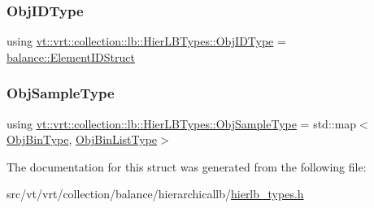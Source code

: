 \subsubsection{\texorpdfstring{Obj\+I\+D\+Type}{ObjIDType}}
{\footnotesize\ttfamily using \hyperlink{structvt_1_1vrt_1_1collection_1_1lb_1_1_hier_l_b_types_a9f71a6bbdc8603a2c58172521f82c5e2}{vt\+::vrt\+::collection\+::lb\+::\+Hier\+L\+B\+Types\+::\+Obj\+I\+D\+Type} =  \hyperlink{namespacevt_1_1vrt_1_1collection_1_1balance_a9f5b53fafb270212279a4757d2c4cd28}{balance\+::\+Element\+I\+D\+Struct}}

\mbox{\label{structvt_1_1vrt_1_1collection_1_1lb_1_1_hier_l_b_types_a597a60d517207b90e8c7984eac434e8f}} 
\subsubsection{\texorpdfstring{Obj\+Sample\+Type}{ObjSampleType}}
{\footnotesize\ttfamily using \hyperlink{structvt_1_1vrt_1_1collection_1_1lb_1_1_hier_l_b_types_a597a60d517207b90e8c7984eac434e8f}{vt\+::vrt\+::collection\+::lb\+::\+Hier\+L\+B\+Types\+::\+Obj\+Sample\+Type} =  std\+::map$<$\hyperlink{structvt_1_1vrt_1_1collection_1_1lb_1_1_hier_l_b_types_a280971a7971a7fc215214e81ba3b12b5}{Obj\+Bin\+Type}, \hyperlink{structvt_1_1vrt_1_1collection_1_1lb_1_1_hier_l_b_types_ac1e6fedb923b2a16f440a61e6dc94173}{Obj\+Bin\+List\+Type}$>$}



The documentation for this struct was generated from the following file\+:\begin{DoxyCompactItemize}
\item 
src/vt/vrt/collection/balance/hierarchicallb/\hyperlink{hierlb__types_8h}{hierlb\+\_\+types.\+h}\end{DoxyCompactItemize}
